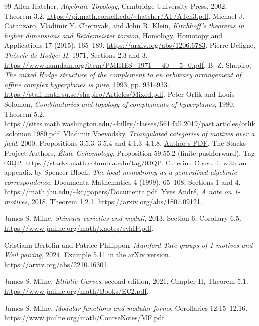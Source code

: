 \documentclass[11pt]{article}
\theoremstyle{definition}
\theoremstyle{remark}
\begin{document}
\begin{thebibliography}{99}
 Allen Hatcher, \emph{Algebraic Topology}, Cambridge University Press, 2002, Theorem 3.2. \url{https://pi.math.cornell.edu/~hatcher/AT/ATch3.pdf}.
 Michael J. Catanzaro, Vladimir Y. Chernyak, and John R. Klein, \emph{Kirchhoff's theorems in higher dimensions and Reidemeister torsion}, Homology, Homotopy and Applications 17 (2015), 165--189. \url{https://arxiv.org/abs/1206.6783}.
 Pierre Deligne, \emph{Th\'eorie de Hodge: II}, 1971, Sections 2.3 and 3. \url{https://www.numdam.org/item/PMIHES_1971__40__5_0.pdf}.
 B. Z. Shapiro, \emph{The mixed Hodge structure of the complement to an arbitrary arrangement of affine complex hyperplanes is pure}, 1993, pp. 931--933. \url{https://staff.math.su.se/shapiro/Articles/Mixed.pdf}.
 Peter Orlik and Louis Solomon, \emph{Combinatorics and topology of complements of hyperplanes}, 1980, Theorem 5.2. \url{https://sites.math.washington.edu/~billey/classes/561.fall.2019/past.articles/orlik.solomon.1980.pdf}.
 Vladimir Voevodsky, \emph{Triangulated categories of motives over a field}, 2000, Propositions 3.5.3--3.5.4 and 4.1.3--4.1.8. \href{https://www.math.ias.edu/Voevodsky/files/files-original/Dropbox/Published_papers/Motives/Collection/s5.pdf}{Author's PDF}.
 The Stacks Project Authors, \emph{\'{E}tale Cohomology}, Proposition 59.55.2 (finite pushforward), Tag 03QP. \url{https://stacks.math.columbia.edu/tag/03QP}.
 Caterina Consani, with an appendix by Spencer Bloch, \emph{The local monodromy as a generalized algebraic correspondence}, Documenta Mathematica 4 (1999), 65--108, Sections 1 and 4. \url{https://math.jhu.edu/~kc/papers/Documenta.pdf}.
 Yves Andr\'e, \emph{A note on 1-motives}, 2018, Theorem 1.2.1. \url{https://arxiv.org/abs/1807.09121}.

 James S. Milne, \emph{Shimura varieties and moduli}, 2013, Section 6, Corollary 6.5. \url{https://www.jmilne.org/math/xnotes/svhIP.pdf}.

 Cristiana Bertolin and Patrice Philippon, \emph{Mumford-Tate groups of 1-motives and Weil pairing}, 2024, Example 5.11 in the arXiv version. \url{https://arxiv.org/abs/2210.16301}.

 James S. Milne, \emph{Elliptic Curves}, second edition, 2021, Chapter II, Theorem 5.1. \url{https://www.jmilne.org/math/Books/EC2.pdf}.

 James S. Milne, \emph{Modular functions and modular forms}, Corollaries 12.15--12.16. \url{https://www.jmilne.org/math/CourseNotes/MF.pdf}.
\end{thebibliography}
\end{document}
